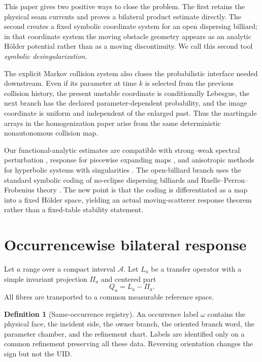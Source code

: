 \documentclass[11pt,reqno]{amsart}
\theoremstyle{definition}
\newtheorem{definition}[theorem]{Definition}
\theoremstyle{remark}
\newcommand{\A}{\mathcal A}
\begin{document}
This paper gives two positive ways to close the problem.  The first retains the
physical seam currents and proves a bilateral product estimate directly.  The
second creates a fixed symbolic coordinate system for an open dispersing
billiard; in that coordinate system the moving obstacle geometry appears as an
analytic Hölder potential rather than as a moving discontinuity.  We call this
second tool \emph{symbolic desingularization}.

The explicit Markov collision system also closes the probabilistic interface
needed downstream.  Even if its parameter at time $k$ is selected from the
previous collision history, the present unstable coordinate is conditionally
Lebesgue, the next branch has the declared parameter-dependent probability,
and the image coordinate is uniform and independent of the enlarged past.
Thus the martingale arrays in the homogenization paper arise from the same
deterministic nonautonomous collision map.

Our functional-analytic estimates are compatible with strong--weak spectral
perturbation \cite{KellerLiverani1999}, response for piecewise expanding maps
\cite{BaladiSmania2008}, and anisotropic methods for hyperbolic systems with
singularities \cite{DemersLiverani2008,DemersZhang2011}.  The open-billiard
branch uses the standard symbolic coding of no-eclipse dispersing billiards and
Ruelle--Perron--Frobenius theory \cite{Bowen1975,ParryPollicott1990,
ChernovMarkarian2006}.  The new point is that the coding is differentiated as a
map into a fixed Hölder space, yielding an actual moving-scatterer response
theorem rather than a fixed-table stability statement.

\section{Occurrencewise bilateral response}\label{sec:bilateral}

Let $a$ range over a compact interval $\A$.  Let $L_a$ be a transfer operator
with a simple invariant projection $\Pi_a$ and centered part
\[
 Q_a=L_a-\Pi_a.
\]
All fibres are transported to a common measurable reference space.

\begin{definition}[Same-occurrence registry]\label{def:registry}
An occurrence label $\omega$ contains the physical face, the incident side,
the owner branch, the oriented branch word, the parameter chamber, and the
refinement chart.  Labels are identified only on a common refinement
preserving all these data.  Reversing orientation changes the sign but not the
UID.
\end{definition}
\end{document}
